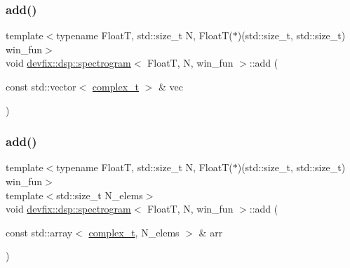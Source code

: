\subsubsection{\texorpdfstring{add()}{add()}\hspace{0.1cm}{\footnotesize\ttfamily [2/3]}}
{\footnotesize\ttfamily template$<$typename FloatT, std\+::size\+\_\+t N, Float\+T($\ast$)(std\+::size\+\_\+t, std\+::size\+\_\+t) win\+\_\+fun$>$ \\
void \hyperlink{structdevfix_1_1dsp_1_1spectrogram}{devfix\+::dsp\+::spectrogram}$<$ FloatT, N, win\+\_\+fun $>$\+::add (\begin{DoxyParamCaption}\item[{const std\+::vector$<$ \hyperlink{structdevfix_1_1dsp_1_1spectrogram_a920fdda446509cfe81fa287773c709cb}{complex\+\_\+t} $>$ \&}]{vec }\end{DoxyParamCaption})\hspace{0.3cm}{\ttfamily [inline]}}

\mbox{\label{structdevfix_1_1dsp_1_1spectrogram_a030123c941c6acc6ea535514c2d138da}} 
\subsubsection{\texorpdfstring{add()}{add()}\hspace{0.1cm}{\footnotesize\ttfamily [3/3]}}
{\footnotesize\ttfamily template$<$typename FloatT, std\+::size\+\_\+t N, Float\+T($\ast$)(std\+::size\+\_\+t, std\+::size\+\_\+t) win\+\_\+fun$>$ \\
template$<$std\+::size\+\_\+t N\+\_\+elems$>$ \\
void \hyperlink{structdevfix_1_1dsp_1_1spectrogram}{devfix\+::dsp\+::spectrogram}$<$ FloatT, N, win\+\_\+fun $>$\+::add (\begin{DoxyParamCaption}\item[{const std\+::array$<$ \hyperlink{structdevfix_1_1dsp_1_1spectrogram_a920fdda446509cfe81fa287773c709cb}{complex\+\_\+t}, N\+\_\+elems $>$ \&}]{arr }\end{DoxyParamCaption})\hspace{0.3cm}{\ttfamily [inline]}}

\mbox{\label{structdevfix_1_1dsp_1_1spectrogram_acdc5a2253a62ae50ae24607cd4f3b555}} 
